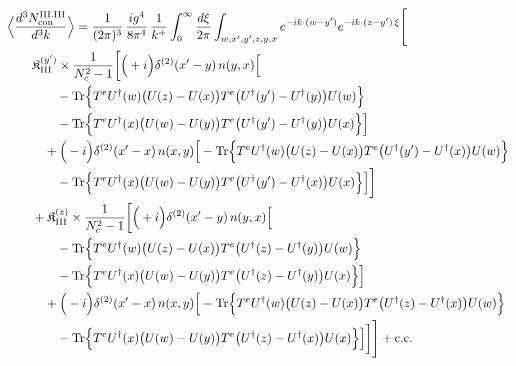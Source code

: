 \begingroup\small
\begin{align}\label{eq:S-III.III-2}
&\Big\langle\frac{d^{3}N^{\rm III.III}_{{\rm con}}}{d^{3}k}\Big\rangle=\frac{1}{(2\pi)^{3}}\, \frac{ig^{4}}{8\pi^{4}}\, \frac{1}{k^{+}} \int_{0}^{\infty}\frac{d\xi}{2\pi} \int_{w,x',y',z,y,x}e^{-ik\cdot(w-y')}e^{-ik\cdot(z-y')\,\xi}\Bigg[\notag\\
&\quad\quad \mathfrak{K}^{(y')}_{\rm III} \times \frac{1}{N_{c}^{2}-1}\bigg[\Big(+i\Big)\delta^{(2)}(x'-y)\, n(y,x)\Big[\notag\\
&\quad\quad\quad\quad -{\rm Tr}\Big\{T^{e}U^{\dagger}(w)\big(U(z)-U(x)\big)T^{e}\big(U^{\dagger}(y')-U^{\dagger}(y)\big)U(w)\Big\}\notag\\
&\quad\quad\quad\quad -{\rm Tr}\Big\{T^{e}U^{\dagger}(x)\big(U(w)-U(y)\big)T^{e}\big(U^{\dagger}(y')-U^{\dagger}(y)\big)U(x)\Big\}\Big]\notag\\
&\quad\quad\quad +\Big(-i\Big)\delta^{(2)}(x'-x)\, n(x,y)\Big[ -{\rm Tr}\Big\{T^{e}U^{\dagger}(w)\big(U(z)-U(x)\big)T^{e}\big(U^{\dagger}(y')-U^{\dagger}(x)\big)U(w)\Big\}\notag\\
&\quad\quad\quad\quad -{\rm Tr}\Big\{T^{e}U^{\dagger}(x)\big(U(w)-U(y)\big)T^{e}\big(U^{\dagger}(y')-U^{\dagger}(x)\big)U(x)\Big\}\Big]\bigg]\notag\\
&\quad\quad + \mathfrak{K}^{(z)}_{\rm III} \times \frac{1}{N_{c}^{2}-1}\bigg[\Big(+i\Big)\delta^{(2)}(x'-y)\, n(y,x)\Big[\notag\\
&\quad\quad\quad\quad -{\rm Tr}\Big\{T^{e}U^{\dagger}(w)\big(U(z)-U(x)\big)T^{e}\big(U^{\dagger}(z)-U^{\dagger}(y)\big)U(w)\Big\}\notag\\
&\quad\quad\quad\quad -{\rm Tr}\Big\{T^{e}U^{\dagger}(x)\big(U(w)-U(y)\big)T^{e}\big(U^{\dagger}(z)-U^{\dagger}(y)\big)U(x)\Big\}\Big]\notag\\
&\quad\quad\quad +\Big(-i\Big)\delta^{(2)}(x'-x)\, n(x,y)\Big[ -{\rm Tr}\Big\{T^{e}U^{\dagger}(w)\big(U(z)-U(x)\big)T^{e}\big(U^{\dagger}(z)-U^{\dagger}(x)\big)U(w)\Big\}\notag\\
&\quad\quad\quad\quad -{\rm Tr}\Big\{T^{e}U^{\dagger}(x)\big(U(w)-U(y)\big)T^{e}\big(U^{\dagger}(z)-U^{\dagger}(x)\big)U(x)\Big\}\Big]\bigg]\Bigg] +{\rm c.c.}
\end{align}
\endgroup

